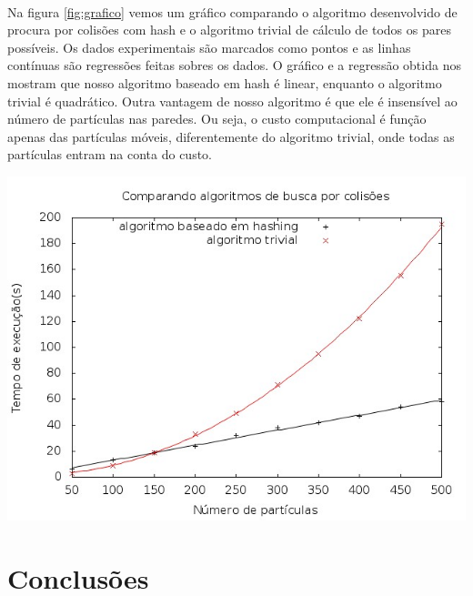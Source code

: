 \documentclass[a0,portrait]{a0poster}
\begin{document}
\begin{multicols}{2}
\paragraph{}Na figura \ref{fig:grafico} vemos um gráfico comparando o algoritmo
desenvolvido de procura por colisões com hash e o algoritmo trivial de cálculo
de todos os pares possíveis. Os dados experimentais são marcados como pontos e
as linhas contínuas são regressões feitas sobres os dados. O gráfico e a
regressão obtida nos mostram que nosso algoritmo baseado em hash é linear,
enquanto o algoritmo trivial é quadrático. Outra
vantagem de nosso algoritmo é que ele é insensível ao número de partículas nas
paredes. Ou seja, o custo computacional é função apenas das partículas móveis,
diferentemente do algoritmo trivial, onde todas as partículas entram na conta
do custo.
\FloatBarrier
    \begin{center}\vspace{3cm}
	\includegraphics[scale = 1.0]{../images/comparandoAlgoritmos.jpg}
	\label{fig:grafico}
    \end{center}\vspace{1cm}
\FloatBarrier


\color{SaddleBrown} %

\section*{Conclusões}


\end{multicols}
\end{document}
